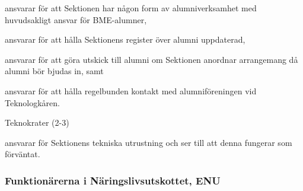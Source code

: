 \documentclass[10pt]{article}
\begin{document}
\begin{emptylist}
\begin{dashlist}
            \item ansvarar för att Sektionen har någon form av alumniverksamhet med huvudsakligt ansvar för BME-alumner,
            \item ansvarar för att hålla Sektionens register över alumni uppdaterad,
            \item ansvarar för att göra utskick till alumni om Sektionen anordnar arrangemang då alumni
bör bjudas in, samt
            \item  ansvarar för att hålla regelbunden kontakt med alumniföreningen vid Teknologkåren.
        \end{dashlist}
    \item Teknokrater (2-3)
        \begin{dashlist}
            \item ansvarar för Sektionens tekniska utrustning och ser till att denna fungerar som förväntat.
        \end{dashlist}
\end{emptylist}

\subsubsection{Funktionärerna i Näringslivsutskottet, ENU}
\end{document}
